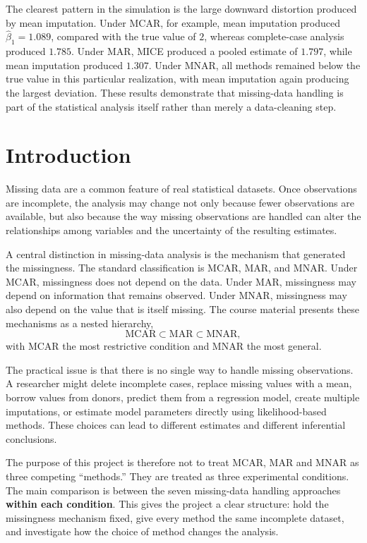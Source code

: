 \documentclass[11pt,a4paper]{article}
\begin{document}
The clearest pattern in the simulation is the large downward distortion produced by mean imputation. Under MCAR, for example, mean imputation produced $\hat{\beta}_1=1.089$, compared with the true value of $2$, whereas complete-case analysis produced $1.785$. Under MAR, MICE produced a pooled estimate of $1.797$, while mean imputation produced $1.307$. Under MNAR, all methods remained below the true value in this particular realization, with mean imputation again producing the largest deviation. These results demonstrate that missing-data handling is part of the statistical analysis itself rather than merely a data-cleaning step.

\newpage
\tableofcontents
\newpage
{}

\section{Introduction}
Missing data are a common feature of real statistical datasets. Once observations are incomplete, the analysis may change not only because fewer observations are available, but also because the way missing observations are handled can alter the relationships among variables and the uncertainty of the resulting estimates.

A central distinction in missing-data analysis is the mechanism that generated the missingness. The standard classification is MCAR, MAR, and MNAR. Under MCAR, missingness does not depend on the data. Under MAR, missingness may depend on information that remains observed. Under MNAR, missingness may also depend on the value that is itself missing. The course material presents these mechanisms as a nested hierarchy,
\[
\text{MCAR}\subset\text{MAR}\subset\text{MNAR},
\]
with MCAR the most restrictive condition and MNAR the most general. 

The practical issue is that there is no single way to handle missing observations. A researcher might delete incomplete cases, replace missing values with a mean, borrow values from donors, predict them from a regression model, create multiple imputations, or estimate model parameters directly using likelihood-based methods. These choices can lead to different estimates and different inferential conclusions.

The purpose of this project is therefore not to treat MCAR, MAR and MNAR as three competing ``methods.'' They are treated as three experimental conditions. The main comparison is between the seven missing-data handling approaches \textbf{within each condition}. This gives the project a clear structure: hold the missingness mechanism fixed, give every method the same incomplete dataset, and investigate how the choice of method changes the analysis.
\end{document}
